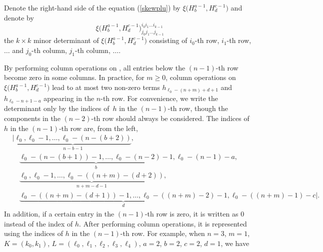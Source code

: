 \documentclass[pdftex]{sigma}
\numberwithin{equation}{section}
\begin{document}
Denote the right-hand side of the equation (\ref{skewplu}) by $\xi\bigl(H^{a-1}_{b},H^{c-1}_{d}\bigr)$ and denote by
\[
\xi\bigl(H^{a-1}_{b},H^{c-1}_{d}\bigr)^{i_0 i_1 \dots i_{k-1}}_{j_0 j_1 \dots j_{k-1}}
\]
the $k\times k$ minor determinant of $\xi\bigl(H^{a-1}_{b},H^{c-1}_{d}\bigr)$ consisting of $i_0$-th row, $i_1$-th row, $\dots$ and $j_0$-th column, $j_1$-th column, $\dots$.

By performing column operations on , all entries below the $(n-1)$-th row become zero in some columns.
In practice, for $m\geq0$, column operations on $\xi\bigl(H^{a-1}_{b},H^{c-1}_{d}\bigr)$ lead to at most two non-zero terms
$h_{\ell_{0}-(n+m)+d+1}$ and $h_{\ell_{0}-n+1-a}$ appearing in the $n$-th row. For convenience, we write the determinant  only by the indices of~$h$ in the $(n-1)$-th row, though the components in the $(n-2)$-th row should always be considered.
The indices of~$h$ in the $(n-1)$-th row are, from the left,
\begin{align}
&| \underbrace{\ell_{0},\ell_{0}-1,\dots,\ell_{0}-(n-(b+2))}_{n-b-1},\nonumber\\
&\quad{}\underbrace{\ell_{0}-(n-(b+1))-1,\dots,\ell_{0}-(n-2)-1}_{b},\ell_{0}-(n-1)-a,\nonumber\\
&\quad{}\underbrace{\ell_{0},\ell_{0}-1,\dots,\ell_{0}-((n+m)-(d+2))}_{n+m-d-1},\nonumber\\
&\quad{}\underbrace{\ell_{0}-((n+m)-(d+1))-1,\dots,\ell_{0}-((n+m)-2)-1}_{d},\ell_{0}-((n+m)-1)-c |.\label{ind}
\end{align}
In addition, if a certain entry in the $(n-1)$-th row is zero, it is written as $0$ instead of the index of $h$. After performing column operations, it is represented using the indices of $h$ in the $(n-1)$-th row. For example, when $n=3$, $m=1$, $K=(k_0,k_1)$, $L=(\ell_{0},\ell_{1},\ell_{2},\ell_{3},\ell_4)$, $a=2$, $b=2$, $c=2$, $d=1$, we have
\end{document}
